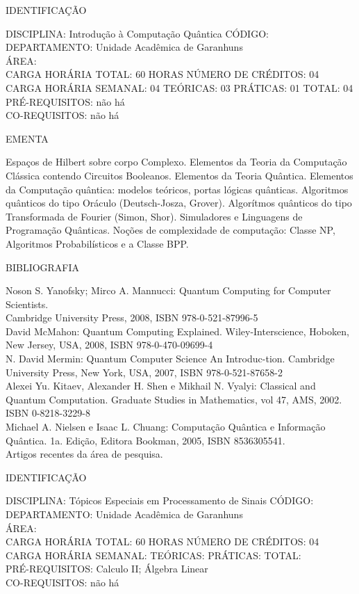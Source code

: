 \documentclass[
	12pt,				%
	openright,			%
  oneside,     %
	a4paper,			%
	english,			%
	french,				%
	spanish,			%
	brazil				%
	]{abntex2}
\begin{document}
\begin{apendicesenv}
\newpage IDENTIFICAÇÃO

DISCIPLINA: Introdução à Computação Quântica CÓDIGO:\\ 
DEPARTAMENTO: Unidade Acadêmica de Garanhuns\\ 
ÁREA: \\
CARGA HORÁRIA TOTAL: 60 HORAS NÚMERO DE CRÉDITOS: 04\\
CARGA HORÁRIA SEMANAL: 04 TEÓRICAS: 03 PRÁTICAS: 01 TOTAL: 04\\
PRÉ-REQUISITOS: não há\\
CO-REQUISITOS: não há

EMENTA 

Espaços de Hilbert sobre corpo Complexo. Elementos da Teoria da
Computação Clássica contendo Circuitos Booleanos. Elementos da Teoria Quântica. Elementos da
Computação quântica: modelos teóricos, portas lógicas quânticas. Algoritmos
quânticos do tipo Oráculo (Deutsch-Josza, Grover). Algorítmos quânticos do tipo Transformada de
Fourier (Simon, Shor). Simuladores e Linguagens de Programação Quânticas. Noções de
complexidade de computação: Classe NP, Algoritmos Probabilísticos e a Classe BPP.

BIBLIOGRAFIA 

Noson S. Yanofsky; Mirco A. Mannucci: Quantum Computing for Computer
Scientists.\\
Cambridge University Press, 2008, ISBN 978-0-521-87996-5 \\
David McMahon: Quantum Computing Explained. Wiley-Interscience,
Hoboken, New Jersey, USA, 2008, ISBN 978-0-470-09699-4\\
N. David Mermin: Quantum Computer Science  An Introduc-tion.
Cambridge University Press, New York, USA, 2007, ISBN 978-0-521-87658-2\\
Alexei Yu. Kitaev, Alexander H. Shen e Mikhail N. Vyalyi: Classical
and Quantum Computation. Graduate Studies in Mathematics, vol 47, AMS, 2002. ISBN
0-8218-3229-8\\
Michael A. Nielsen e Isaac L. Chuang: Computação Quântica e
Informação Quântica. 1a. Edição, Editora Bookman, 2005, ISBN 8536305541.\\
Artigos recentes da área de pesquisa.

\newpage IDENTIFICAÇÃO

DISCIPLINA: Tópicos Especiais em Processamento de Sinais CÓDIGO:\\ 
DEPARTAMENTO: Unidade Acadêmica de Garanhuns\\
ÁREA: \\
CARGA HORÁRIA TOTAL: 60 HORAS NÚMERO DE CRÉDITOS: 04\\
CARGA HORÁRIA SEMANAL: TEÓRICAS: PRÁTICAS: TOTAL: \\
PRÉ-REQUISITOS: Calculo II; Álgebra Linear\\
CO-REQUISITOS: não há


\end{apendicesenv}
\end{document}
